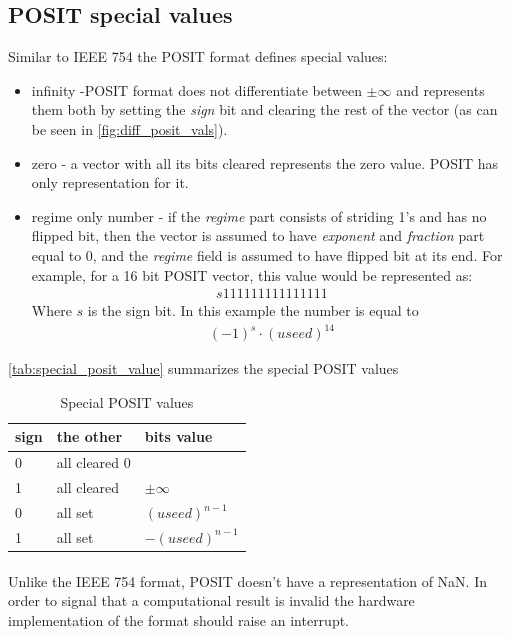 \documentclass[10pt]{article}
\begin{document}
\subsection{POSIT special values}\label{sec:posit-special-values}

Similar to IEEE 754 the POSIT format defines special values:
\begin{itemize}
  \item infinity -POSIT format does not differentiate between $\pm\infty$ and
    represents them both by setting the \textit{sign} bit and clearing the rest
    of the vector (as can be seen in \autoref{fig:diff_posit_vals}).
  \item zero - a vector with all its bits cleared represents the zero value.
    POSIT has only representation for it.
  \item regime only number - if the \textit{regime} part consists of striding 1's and has
    no flipped bit, then the vector is assumed to have \textit{exponent} and
    \textit{fraction} part equal to 0, and the \textit{regime} field is assumed
    to have flipped bit at its end. For example, for a 16 bit POSIT vector, this
    value would be represented as:
    \begin{align*}
      s111111111111111
    \end{align*}
    Where $s$ is the sign bit. In this example the number is equal to
    \begin{align*}
      (-1)^{s}\cdot (useed)^{14}
    \end{align*}
  \end{itemize}

  \autoref{tab:special_posit_value} summarizes the special POSIT values
  \begin{table}[h]\centering
    \begin{tabular}{|l|l|l|}
      \hline
      sign & the other & bits value \\
      \hline
      0 & all cleared 0 & \\
      \hline
      1 & all cleared & $\pm \infty $ \\
      \hline
      0 & all set & $(useed)^{n- 1} $ \\
      \hline
      1 & all set & $-(useed)^{n-1} $ \\
      \hline
    \end{tabular}

    \caption{Special POSIT values}
    \label{tab:special_posit_value}
  \end{table}
\paragraph{}
Unlike the IEEE 754 format, POSIT doesn't have a representation of NaN. In order
to signal that a computational result is invalid the hardware implementation of
the format should raise an interrupt.
\end{document}
